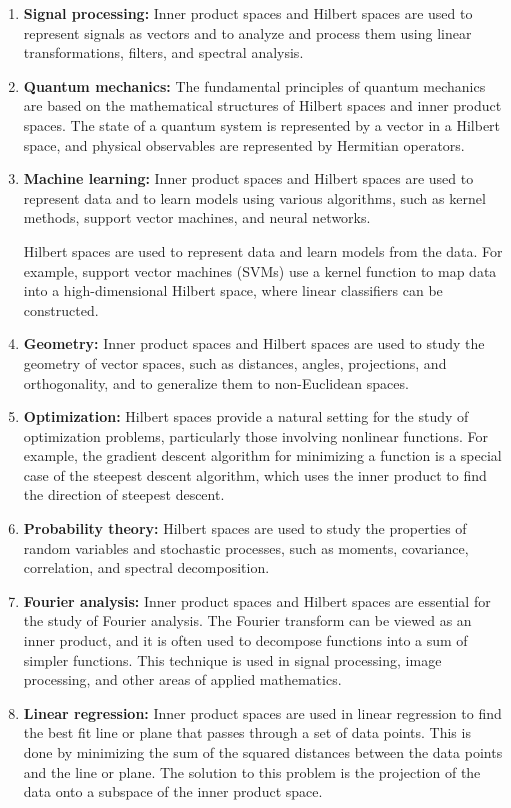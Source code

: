 \documentclass[12pt, a4paper]{article} %
\begin{document}
    \begin{enumerate}
        \item {\bf Signal processing:} Inner product spaces and Hilbert spaces are used to represent signals as vectors and to analyze and process them using linear transformations, filters, and spectral analysis.
        \item {\bf Quantum mechanics:} The fundamental principles of quantum mechanics are based on the mathematical structures of Hilbert spaces and inner product spaces. The state of a quantum system is represented by a vector in a Hilbert space, and physical observables are represented by Hermitian operators.
        \item {\bf Machine learning:} Inner product spaces and Hilbert spaces are used to represent data and to learn models using various algorithms, such as kernel methods, support vector machines, and neural networks.
        

        Hilbert spaces are used to represent data and learn models from the data. For example, support vector machines (SVMs) use a kernel function to map data into a high-dimensional Hilbert space, where linear classifiers can be constructed.

        \item {\bf Geometry:} Inner product spaces and Hilbert spaces are used to study the geometry of vector spaces, such as distances, angles, projections, and orthogonality, and to generalize them to non-Euclidean spaces.
       
        \item {\bf Optimization:} Hilbert spaces provide a natural setting for the study of optimization problems, particularly those involving nonlinear functions. For example, the gradient descent algorithm for minimizing a function is a special case of the steepest descent algorithm, which uses the inner product to find the direction of steepest descent.

        \item {\bf Probability theory:} Hilbert spaces are used to study the properties of random variables and stochastic processes, such as moments, covariance, correlation, and spectral decomposition.
        \item {\bf Fourier analysis:} Inner product spaces and Hilbert spaces are essential for the study of Fourier analysis. The Fourier transform can be viewed as an inner product, and it is often used to decompose functions into a sum of simpler functions. This technique is used in signal processing, image processing, and other areas of applied mathematics.
        \item {\bf Linear regression:} Inner product spaces are used in linear regression to find the best fit line or plane that passes through a set of data points. This is done by minimizing the sum of the squared distances between the data points and the line or plane. The solution to this problem is the projection of the data onto a subspace of the inner product space.
    \end{enumerate}
\end{document}
